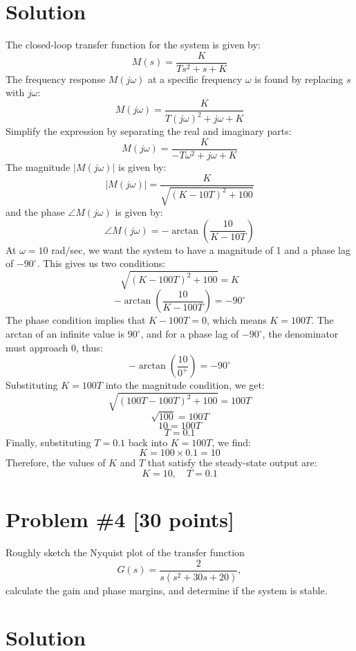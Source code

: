 \documentclass[11pt]{article}
\begin{document}
\section*{Solution}
The closed-loop transfer function for the system is given by:
\[
M(s) = \frac{K}{Ts^2 + s + K}
\]
The frequency response \( M(j\omega) \) at a specific frequency \( \omega \) is found by replacing \( s \) with \( j\omega \):
\[
M(j\omega) = \frac{K}{T(j\omega)^2 + j\omega + K}
\]
Simplify the expression by separating the real and imaginary parts:
\[
M(j\omega) = \frac{K}{-T\omega^2 + j\omega + K}
\]
The magnitude \( |M(j\omega)| \) is given by:
\[
|M(j\omega)| = \frac{K}{\sqrt{(K - 10T)^2 + 100}}
\]
and the phase \( \angle M(j\omega) \) is given by:
\[
\angle M(j\omega) = -\arctan\left(\frac{10}{K - 10T}\right)
\]
At \( \omega = 10 \) rad/sec, we want the system to have a magnitude of 1 and a phase lag of \( -90^\circ \). This gives us two conditions:
\[
\sqrt{(K - 100T)^2 + 100} = K
\]
\[
-\arctan\left(\frac{10}{K - 100T}\right) = -90^\circ
\]
The phase condition implies that \( K - 100T = 0 \), which means \( K = 100T \). The arctan of an infinite value is \( 90^\circ \), and for a phase lag of \( -90^\circ \), the denominator must approach 0, thus:
\[
-\arctan\left(\frac{10}{0^+}\right) = -90^\circ
\]
Substituting \( K = 100T \) into the magnitude condition, we get:
\[
\sqrt{(100T - 100T)^2 + 100} = 100T
\]
\[
\sqrt{100} = 100T
\]
\[
10 = 100T
\]
\[
T = 0.1
\]
Finally, substituting \( T = 0.1 \) back into \( K = 100T \), we find:
\[
K = 100 \times 0.1 = 10
\]
Therefore, the values of \( K \) and \( T \) that satisfy the steady-state output are:
\[
K = 10, \quad T = 0.1
\]
\newpage
\section*{Problem \#4 [30 points]}
Roughly sketch the Nyquist plot of the transfer function 
\[
G(s) = \frac{2}{s(s^2 + 30s + 20)},
\]
calculate the gain and phase margins, and determine if the system is stable.

\section*{Solution}
\end{document}
